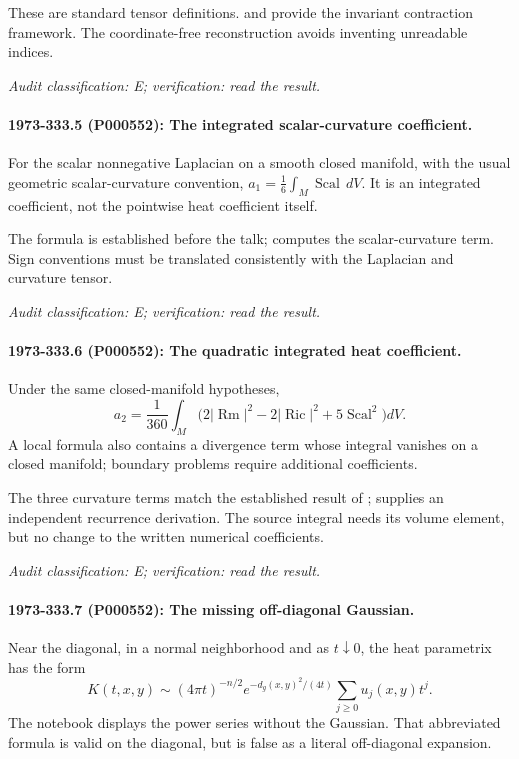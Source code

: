 These are standard tensor definitions. \citet[\S7]{mckeansinger1967curvature} and \citet[\S1]{gilkey1979recursion} provide the invariant contraction framework. The coordinate-free reconstruction avoids inventing unreadable indices.

\emph{Audit classification: E; verification: read the result.}

\paragraph{1973-333.5 (P000552): The integrated scalar-curvature coefficient.}
For the scalar nonnegative Laplacian on a smooth closed manifold, with the usual geometric scalar-curvature convention, \(a_1=\frac16\int_M\operatorname{Scal}\,dV\). It is an integrated coefficient, not the pointwise heat coefficient itself.

The formula is established before the talk; \citet[\S1, equation (5a), and \S4]{mckeansinger1967curvature} computes the scalar-curvature term. Sign conventions must be translated consistently with the Laplacian and curvature tensor.

\emph{Audit classification: E; verification: read the result.}

\paragraph{1973-333.6 (P000552): The quadratic integrated heat coefficient.}
Under the same closed-manifold hypotheses, \[a_2=\frac1{360}\int_M\bigl(2|\operatorname{Rm}|^2-2|\operatorname{Ric}|^2+5\operatorname{Scal}^2\bigr)dV.\] A local formula also contains a divergence term whose integral vanishes on a closed manifold; boundary problems require additional coefficients.

The three curvature terms match the established result of \citet[\S7]{mckeansinger1967curvature}; \citet[introduction and \S4]{gilkey1979recursion} supplies an independent recurrence derivation. The source integral needs its volume element, but no change to the written numerical coefficients.

\emph{Audit classification: E; verification: read the result.}

\paragraph{1973-333.7 (P000552): The missing off-diagonal Gaussian.}
Near the diagonal, in a normal neighborhood and as \(t\downarrow0\), the heat parametrix has the form \[K(t,x,y)\sim(4\pi t)^{-n/2}e^{-d_g(x,y)^2/(4t)}\sum_{j\ge0}u_j(x,y)t^j.\] The notebook displays the power series without the Gaussian. That abbreviated formula is valid on the diagonal, but is false as a literal off-diagonal expansion.


